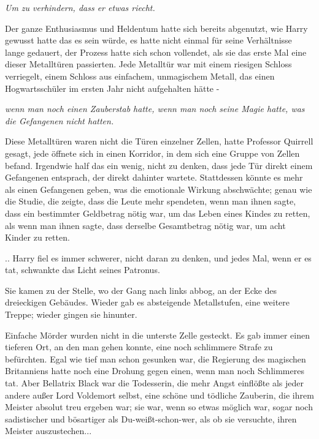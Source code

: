 \emph{Um zu verhindern, dass er etwas riecht.}

Der ganze Enthusiasmus und Heldentum hatte sich bereits abgenutzt, wie Harry
gewusst hatte das es sein würde, es hatte nicht einmal für seine Verhältnisse
lange gedauert, der Prozess hatte sich schon vollendet, als sie das erste Mal
eine dieser Metalltüren passierten. Jede Metalltür war mit einem riesigen
Schloss verriegelt, einem Schloss aus einfachem, unmagischem Metall, das einen
Hogwartsschüler im ersten Jahr nicht aufgehalten hätte -

\emph{wenn man noch einen Zauberstab hatte, wenn man noch seine Magie hatte,
was die Gefangenen nicht hatten.}

Diese Metalltüren waren nicht die Türen einzelner Zellen, hatte Professor
Quirrell gesagt, jede öffnete sich in einen Korridor, in dem sich eine Gruppe
von Zellen befand. Irgendwie half das ein wenig, nicht zu denken, dass jede Tür
direkt einem Gefangenen entsprach, der direkt dahinter wartete. Stattdessen
könnte es mehr als einen Gefangenen geben, was die emotionale Wirkung
abschwächte; genau wie die Studie, die zeigte, dass die Leute mehr spendeten,
wenn man ihnen sagte, dass ein bestimmter Geldbetrag nötig war, um das Leben
eines Kindes zu retten, als wenn man ihnen sagte, dass derselbe Gesamtbetrag
nötig war, um acht Kinder zu retten.

.. Harry fiel es immer schwerer, nicht daran zu denken, und jedes Mal, wenn er
es tat, schwankte das Licht seines Patronus.

Sie kamen zu der Stelle, wo der Gang nach links abbog, an der Ecke des
dreieckigen Gebäudes. Wieder gab es absteigende Metallstufen, eine weitere
Treppe; wieder gingen sie hinunter.

Einfache Mörder wurden nicht in die unterste Zelle gesteckt. Es gab immer einen
tieferen Ort, an den man gehen konnte, eine noch schlimmere Strafe zu
befürchten. Egal wie tief man schon gesunken war, die Regierung des magischen
Britanniens hatte noch eine Drohung gegen einen, wenn man noch Schlimmeres tat.
Aber Bellatrix Black war die Todesserin, die mehr Angst einflößte als jeder
andere außer Lord Voldemort selbst, eine schöne und tödliche Zauberin, die ihrem
Meister absolut treu ergeben war; sie war, wenn so etwas möglich war, sogar noch
sadistischer und bösartiger als Du-weißt-schon-wer, als ob sie versuchte, ihren
Meister auszustechen...

